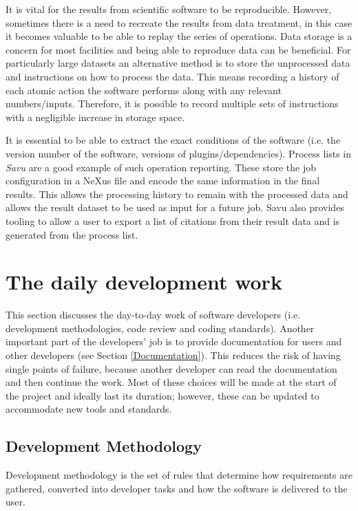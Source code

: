 \documentclass[jnr]{iosart2x}
\begin{document}
It is vital for the results from scientific software to be reproducible.
However, sometimes there is a need to recreate the results from data treatment, in this case it becomes valuable to be able to replay the series of operations.
Data storage is a concern for most facilities and being able to reproduce data can be beneficial.
For particularly large datasets an alternative method is to store the unprocessed data and instructions on how to process the data.
This means recording a history of each atomic action the software performs along with any relevant numbers/inputs.
Therefore, it is possible to record multiple sets of instructions with a negligible increase in storage space.

It is essential to be able to extract the exact conditions of the software (i.e. the version number of the software, versions of plugins/dependencies).
Process lists in {\it Savu} \cite{Wadeson_2016} are a good example of such operation reporting.
These store the job configuration in a NeXus file and encode the same information in the final results.
This allows the processing history to remain with the processed data and allows the result dataset to be used as input for a future job.
Savu also provides tooling to allow a user to export a list of citations from their result data and is generated from the process list.

\section{The daily development work}
\label{Business as Usual}

This section discusses the day-to-day work of software developers (i.e. development methodologies, code review and coding standards).
Another important part of the developers' job is to provide documentation for users and other developers (see Section \ref{Documentation}).
This reduces the risk of having single points of failure, because another developer can read the documentation and then continue the work.
Most of these choices will be made at the start of the project and ideally last its duration; however, these can be updated to accommodate new tools and standards.

\subsection{Development Methodology}
\label{Development methodology}

Development methodology is the set of rules that determine how requirements are gathered, converted into developer tasks and how the software is delivered to the user.
\end{document}
